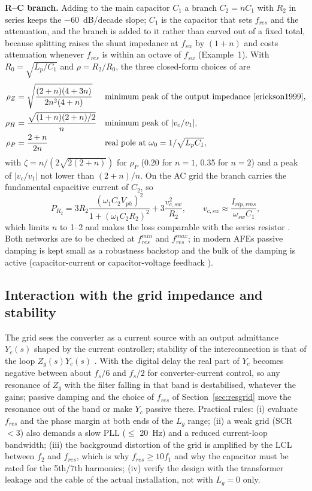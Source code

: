 \documentclass[10pt,a4paper]{scrartcl}
\newcommand{\fsw}{f_{sw}}
\newcommand{\wsw}{\omega_{sw}}
\newcommand{\fres}{f_{res}}
\newcommand{\Lg}{L_{g}}
\begin{document}
\begin{onehalfspace}
\textbf{R--C branch.} Adding to the main capacitor $C_1$ a branch $C_2 = nC_1$ with $R_2$ in series keeps the $-60$~dB/decade slope; $C_1$ is the capacitor that sets $\fres$ and the attenuation, and the branch is added to it rather than carved out of a fixed total, because splitting raises the shunt impedance at $\fsw$ by $(1+n)$ and costs attenuation whenever $\fres$ is within an octave of $\fsw$ (Example~1). With $R_0 = \sqrt{L_p/C_1}$ and $\rho = R_2/R_0$, the three closed-form choices of \cite{bagnara2026} are
\begin{align}
\rho_Z &= \sqrt{\frac{(2+n)(4+3n)}{2n^2(4+n)}} && \text{minimum peak of the output impedance \cite{erickson1999}}, \label{eq:rRC}\\
\rho_H &= \frac{\sqrt{(1+n)(2+n)/2}}{n} && \text{minimum peak of } |v_c/v_1|, \nonumber\\
\rho_P &= \frac{2+n}{2n} && \text{real pole at } \omega_0 = 1/\sqrt{L_p C_1}, \nonumber
\end{align}
with $\zeta = n/(2\sqrt{2(2+n)})$ for $\rho_P$ (0.20 for $n = 1$, 0.35 for $n = 2$) and a peak of $|v_c/v_1|$ not lower than $(2+n)/n$. On the AC grid the branch carries the fundamental capacitive current of $C_2$, so
\begin{equation}
P_{R_2} = 3 R_2 \frac{(\omega_1 C_2 V_{ph})^2}{1 + (\omega_1 C_2 R_2)^2} + 3\frac{v_{c,sw}^2}{R_2},\qquad v_{c,sw} \approx \frac{I_{rip,rms}}{\wsw C_1},
\label{eq:PR2}
\end{equation}
which limits $n$ to \numrange{1}{2} and makes the loss comparable with the series resistor \cite{pena2013}. Both networks are to be checked at $\fres^{min}$ and $\fres^{max}$; in modern AFEs passive damping is kept small as a robustness backstop and the bulk of the damping is active (capacitor-current or capacitor-voltage feedback \cite{dannehl2009,pena2014,teodorescu2011}).

\subsection{Interaction with the grid impedance and stability}
The grid sees the converter as a current source with an output admittance $Y_c(s)$ shaped by the current controller; stability of the interconnection is that of the loop $Z_g(s)Y_c(s)$ \cite{sun2011}. With the digital delay the real part of $Y_c$ becomes negative between about $f_s/6$ and $f_s/2$ for converter-current control, so any resonance of $Z_g$ with the filter falling in that band is destabilised, whatever the gains; passive damping and the choice of $\fres$ of Section~\ref{sec:resgrid} move the resonance out of the band or make $Y_c$ passive there. Practical rules: (i) evaluate $\fres$ and the phase margin at both ends of the $\Lg$ range; (ii) a weak grid (SCR $< 3$) also demands a slow PLL ($\le$ \SI{20}{Hz}) and a reduced current-loop bandwidth; (iii) the background distortion of the grid is amplified by the LCL between $f_2$ and $\fres$, which is why $\fres \ge 10 f_1$ and why the capacitor must be rated for the 5th/7th harmonics; (iv) verify the design with the transformer leakage and the cable of the actual installation, not with $\Lg = 0$ only.



\end{onehalfspace}
\end{document}
